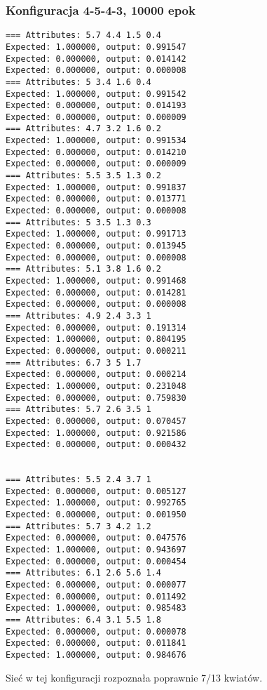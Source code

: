 \documentclass{classrep}
\begin{document}
\subsubsection{Konfiguracja 4-5-4-3, 10000 epok}
\begin{lstlisting}[basicstyle=\small]
=== Attributes: 5.7 4.4 1.5 0.4 
Expected: 1.000000, output: 0.991547
Expected: 0.000000, output: 0.014142
Expected: 0.000000, output: 0.000008
=== Attributes: 5 3.4 1.6 0.4 
Expected: 1.000000, output: 0.991542
Expected: 0.000000, output: 0.014193
Expected: 0.000000, output: 0.000009
=== Attributes: 4.7 3.2 1.6 0.2 
Expected: 1.000000, output: 0.991534
Expected: 0.000000, output: 0.014210
Expected: 0.000000, output: 0.000009
=== Attributes: 5.5 3.5 1.3 0.2 
Expected: 1.000000, output: 0.991837
Expected: 0.000000, output: 0.013771
Expected: 0.000000, output: 0.000008
=== Attributes: 5 3.5 1.3 0.3 
Expected: 1.000000, output: 0.991713
Expected: 0.000000, output: 0.013945
Expected: 0.000000, output: 0.000008
=== Attributes: 5.1 3.8 1.6 0.2 
Expected: 1.000000, output: 0.991468
Expected: 0.000000, output: 0.014281
Expected: 0.000000, output: 0.000008
=== Attributes: 4.9 2.4 3.3 1 
Expected: 0.000000, output: 0.191314
Expected: 1.000000, output: 0.804195
Expected: 0.000000, output: 0.000211
=== Attributes: 6.7 3 5 1.7 
Expected: 0.000000, output: 0.000214
Expected: 1.000000, output: 0.231048
Expected: 0.000000, output: 0.759830
=== Attributes: 5.7 2.6 3.5 1 
Expected: 0.000000, output: 0.070457
Expected: 1.000000, output: 0.921586
Expected: 0.000000, output: 0.000432


=== Attributes: 5.5 2.4 3.7 1 
Expected: 0.000000, output: 0.005127
Expected: 1.000000, output: 0.992765
Expected: 0.000000, output: 0.001950
=== Attributes: 5.7 3 4.2 1.2 
Expected: 0.000000, output: 0.047576
Expected: 1.000000, output: 0.943697
Expected: 0.000000, output: 0.000454
=== Attributes: 6.1 2.6 5.6 1.4 
Expected: 0.000000, output: 0.000077
Expected: 0.000000, output: 0.011492
Expected: 1.000000, output: 0.985483
=== Attributes: 6.4 3.1 5.5 1.8 
Expected: 0.000000, output: 0.000078
Expected: 0.000000, output: 0.011841
Expected: 1.000000, output: 0.984676
\end{lstlisting}

Sieć w tej konfiguracji rozpoznała poprawnie 7/13 kwiatów.
\end{document}

